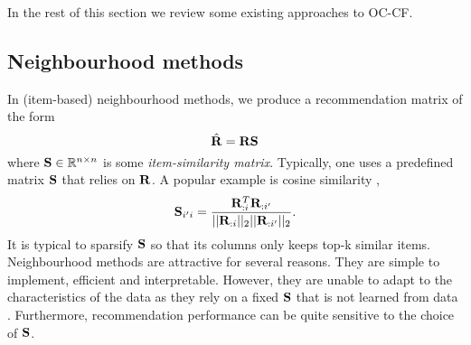 In the rest of this section we review some existing approaches to OC-CF.
%
\subsection{Neighbourhood methods}
\label{sec:knn}

In (item-based) neighbourhood methods, we produce a recommendation matrix of the form
\begin{equation}
\label{eqn:knn}
\hat{\mathbf{R}} = \mathbf{R} \mathbf{S}
\end{equation}
where $\mathbf{S} \in \mathbb{R}^{n \times n}$ is some \emph{item-similarity matrix}.
Typically, one uses a predefined matrix $\mathbf{S}$ that relies on $\mathbf{R}$. A popular example is cosine similarity \citep{Sarwar:2001, Linden:2003}, 
$$ \mathbf{S}_{i' i} = \frac{ \mathbf{R}_{:i}^T \mathbf{R}_{:i'} }{|| \mathbf{R}_{:i} ||_2 || \mathbf{R}_{:i'} ||_2}. $$
It is typical to sparsify $\mathbf{S}$ so that its columns only keeps top-k similar items. 
Neighbourhood methods are attractive for several reasons.
They are simple to implement, efficient 
and interpretable.
However, they are unable to adapt to the characteristics of the data as they rely on a fixed $\mathbf{S}$ that is not learned from data \citep{Koren:2008b}. Furthermore, recommendation performance can be quite sensitive to the choice of $\mathbf{S}$.

